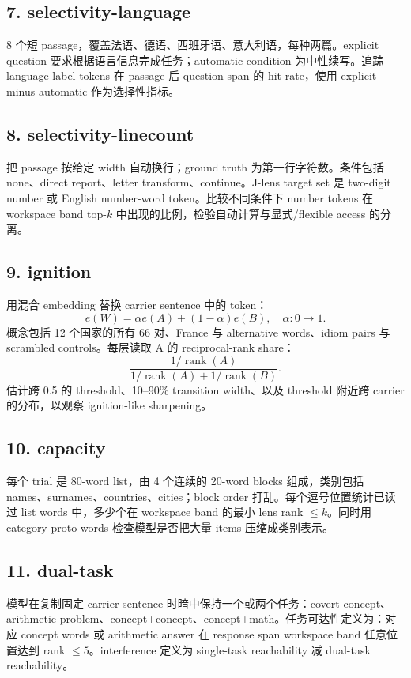\documentclass[10.5pt,a4paper]{ctexart}
\begin{document}
\subsection{7. selectivity-language}
8 个短 passage，覆盖法语、德语、西班牙语、意大利语，每种两篇。explicit question 要求根据语言信息完成任务；automatic condition 为中性续写。追踪 language-label tokens 在 passage 后 question span 的 hit rate，使用 explicit minus automatic 作为选择性指标。

\subsection{8. selectivity-linecount}
把 passage 按给定 width 自动换行；ground truth 为第一行字符数。条件包括 none、direct report、letter transform、continue。J-lens target set 是 two-digit number 或 English number-word token。比较不同条件下 number tokens 在 workspace band top-$k$ 中出现的比例，检验自动计算与显式/flexible access 的分离。

\subsection{9. ignition}
用混合 embedding 替换 carrier sentence 中的 token：
\[
e(W)=\alpha e(A)+(1-\alpha)e(B),\quad \alpha:0\rightarrow1.
\]
概念包括 12 个国家的所有 66 对、France 与 alternative words、idiom pairs 与 scrambled controls。每层读取 A 的 reciprocal-rank share：
\[
\frac{1/\operatorname{rank}(A)}{1/\operatorname{rank}(A)+1/\operatorname{rank}(B)}.
\]
估计跨 0.5 的 threshold、10--90\% transition width、以及 threshold 附近跨 carrier 的分布，以观察 ignition-like sharpening。

\subsection{10. capacity}
每个 trial 是 80-word list，由 4 个连续的 20-word blocks 组成，类别包括 names、surnames、countries、cities；block order 打乱。每个逗号位置统计已读过 list words 中，多少个在 workspace band 的最小 lens rank $\le k$。同时用 category proto words 检查模型是否把大量 items 压缩成类别表示。

\subsection{11. dual-task}
模型在复制固定 carrier sentence 时暗中保持一个或两个任务：covert concept、arithmetic problem、concept+concept、concept+math。任务可达性定义为：对应 concept words 或 arithmetic answer 在 response span workspace band 任意位置达到 rank $\le5$。interference 定义为 single-task reachability 减 dual-task reachability。
\end{document}
